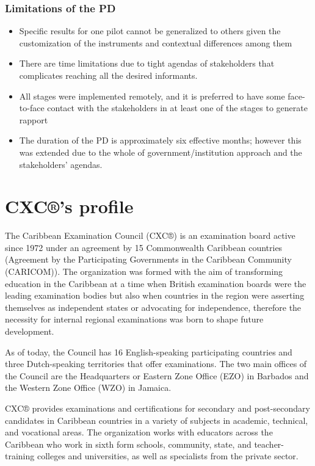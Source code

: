 \documentclass[
  10pt,
]{book}
\begin{document}
\hypertarget{limitations-of-the-pd}{%
\subsection*{Limitations of the PD}\label{limitations-of-the-pd}}

\begin{itemize}
\item
  Specific results for one pilot cannot be generalized to others given the customization of the instruments and contextual differences among them
\item
  There are time limitations due to tight agendas of stakeholders that complicates reaching all the desired informants.
\item
  All stages were implemented remotely, and it is preferred to have some face-to-face contact with the stakeholders in at least one of the stages to generate rapport
\item
  The duration of the PD is approximately six effective months; however this was extended due to the whole of government/institution approach and the stakeholders' agendas.
\end{itemize}

\hypertarget{section4}{%
\chapter{CXC®'s profile}\label{section4}}

The Caribbean Examination Council (CXC®) is an examination board active since 1972 under an agreement by 15 Commonwealth Caribbean countries (Agreement by the Participating Governments in the Caribbean Community (CARICOM)). The organization was formed with the aim of transforming education in the Caribbean at a time when British examination boards were the leading examination bodies but also when countries in the region were asserting themselves as independent states or advocating for independence, therefore the necessity for internal regional examinations was born to shape future development.

As of today, the Council has 16 English-speaking participating countries and three Dutch-speaking territories that offer examinations. The two main offices of the Council are the Headquarters or Eastern Zone Office (EZO) in Barbados and the Western Zone Office (WZO) in Jamaica.

CXC® provides examinations and certifications for secondary and post-secondary candidates in Caribbean countries in a variety of subjects in academic, technical, and vocational areas. The organization works with educators across the Caribbean who work in sixth form schools, community, state, and teacher-training colleges and universities, as well as specialists from the private sector.
\end{document}
